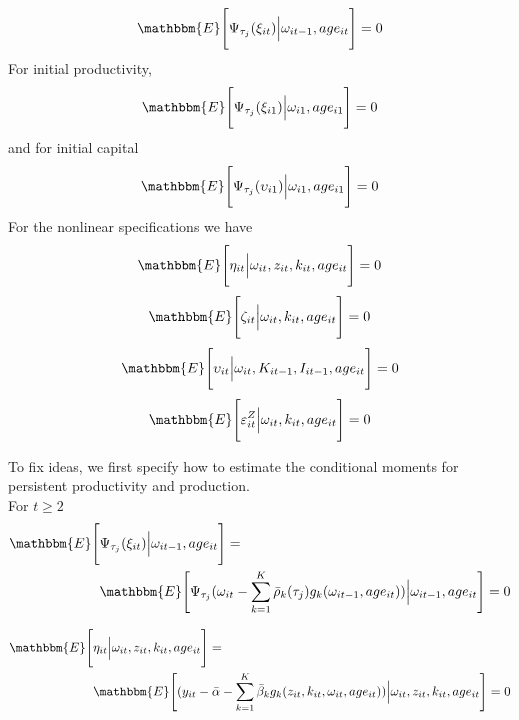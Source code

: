 \documentclass{article}
\begin{document}
\begin{equation}\label{omegaqmoment}
\mathbbm{E}\Bigg[\Psi_{\tau_{j}}(\xi_{it})\Big|\omega_{it-1}, age_{it}\Bigg]=0
\end{equation}
For initial productivity,
\begin{equation}\label{omega1qmoment}
\mathbbm{E}\Bigg[\Psi_{\tau_{j}}(\xi_{i1})\Big|\omega_{i1}, age_{i1}\Bigg]=0
\end{equation}
and for initial capital
\begin{equation}\label{k1qmoment}
\mathbbm{E}\Bigg[\Psi_{\tau_{j}}(\upsilon_{i1})\Big|\omega_{i1}, age_{i1}\Bigg]=0
\end{equation}
For the nonlinear specifications we have
\begin{equation}\label{yemoment}
\mathbbm{E}\Bigg[\eta_{it}\Big|\omega_{it}, z_{it}, k_{it}, age_{it}\Bigg]=0
\end{equation}
\begin{equation}\label{iemoment}
\mathbbm{E}\Bigg[\zeta_{it}\Big|\omega_{it}, k_{it}, age_{it}\Bigg]=0
\end{equation}
\begin{equation}\label{kemoment}
\mathbbm{E}\Bigg[\upsilon_{it}\Big|\omega_{it}, K_{it-1}, I_{it-1},  age_{it}\Bigg]=0
\end{equation}
\begin{equation}\label{emoment}
\mathbbm{E}\Bigg[\varepsilon^{Z}_{it}\Big|\omega_{it}, k_{it}, age_{it}\Bigg]=0
\end{equation}

To fix ideas, we first specify how to estimate the conditional moments for persistent productivity and production.\\

\noindent For $t\geq 2$
\begin{equation}\label{omegamoment}
\begin{split}
\mathbbm{E}\Bigg[&\Psi_{\tau_{j}}(\xi_{it})\Big|\omega_{it-1}, age_{it}\Bigg]=\\
&\mathbbm{E}\Bigg[\Psi_{\tau_{j}}(\omega_{it}-\sum_{k=1}^{K}\bar{\rho}_{k}(\tau_{j})g_{k}(\omega_{it-1}, age_{it}))\Big|\omega_{it-1}, age_{it}\Bigg]=0
\end{split}
\end{equation}

\begin{equation}\label{ymoment}
\begin{split}
\mathbbm{E}\Bigg[&\eta_{it}\Big|\omega_{it}, z_{it}, k_{it}, age_{it}\Bigg]=\\
&\mathbbm{E}\Bigg[(y_{it}-\bar{\alpha}-\sum_{k=1}^{K}\bar{\beta}_{k}g_{k}(z_{it}, k_{it}, \omega_{it}, age_{it}))\Big|\omega_{it}, z_{it}, k_{it}, age_{it}\Bigg]=0
\end{split}
\end{equation}
\end{document}

